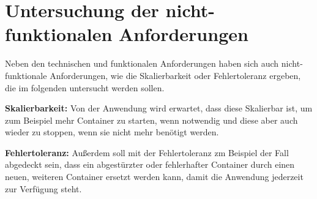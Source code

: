 \section{Untersuchung der nicht-funktionalen Anforderungen}
Neben den technischen und funktionalen Anforderungen haben sich auch nicht-funktionale Anforderungen, wie die Skalierbarkeit oder Fehlertoleranz ergeben, die im folgenden untersucht werden sollen.

\textbf{Skalierbarkeit:} Von der Anwendung wird erwartet, dass diese Skalierbar ist, um zum Beispiel mehr Container zu starten, wenn notwendig und diese aber auch wieder zu stoppen, wenn sie nicht mehr benötigt werden.

\textbf{Fehlertoleranz:} Außerdem soll mit der Fehlertoleranz zm Beispiel der Fall abgedeckt sein, dass ein abgestürzter oder fehlerhafter Container durch einen neuen, weiteren Container ersetzt werden kann, damit die Anwendung jederzeit zur Verfügung steht.
\pagebreak